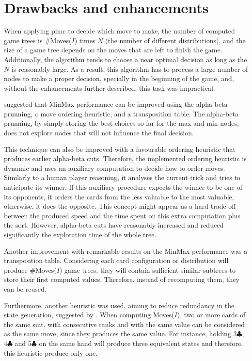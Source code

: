 \section{Drawbacks and enhancements}

When applying \ac{pimc} to decide which move to make, the number of computed game trees is \#Moves($I$) times $N$ (the number of different distributions), and the size of a game tree depends on the moves that are left to finish the game.
Additionally, the algorithm tends to choose a near optimal decision as long as the $N$ is reasonably large.
As a result, this algorithm has to process a large number of nodes to make a proper decision, specially in the beginning of the game, and, without the enhancements further described, this task was impractical.

\citet*{Russell2009} suggested that MinMax performance can be improved using the alpha-beta prunning, a move ordering heuristic, and a transposition table.
The alpha-beta prunning, by simply storing the best choices so far for the max and min nodes, does not explore nodes that will not influence the final decision.

This technique can also be improved with a favourable ordering heuristic that produces earlier alpha-beta cuts.
Therefore, the implemented ordering heuristic is dynamic and uses an auxiliary computation to decide how to order moves.
Similarly to a human player reasoning, it analyses the current trick and tries to anticipate its winner.
If this auxiliary procedure expects the winner to be one of its opponents, it orders the cards from the less valuable to the most valuable, otherwise, it does the opposite.
This concept might appear as a hard trade-off between the produced speed and the time spent on this extra computation plus the sort.
However, alpha-beta cuts have reasonably increased and reduced significantly the exploration time of the whole tree.

Another improvement with remarkable results on the MinMax performance was a transposition table.
Considering each card configuration or distribution will produce \#Moves($I$) game trees, they will contain sufficient similar subtrees to store their first computed values.
Therefore, instead of recomputing them, they can be reused.

Furthermore, another heuristic was used, aiming to reduce redundancy in the state generation, suggested by \citet{Buro}.
When computing Moves($I$), two or more cards of the same suit, with consecutive ranks and with the same value can be considered as the same move, since they produces the same value.
For instance, holding 3$\clubsuit$, 4$\clubsuit$ and 5$\clubsuit$ on the same hand will produce three equivalent states and therefore, this heuristic produce only one.

